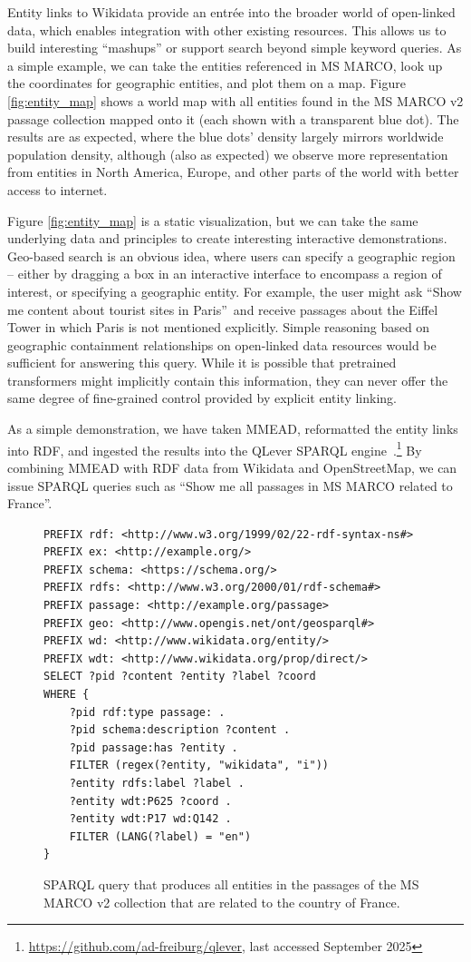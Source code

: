 Entity links to Wikidata provide an entr\'ee into the broader world of open-linked data, which enables integration with other existing resources.
This allows us to build interesting ``mashups'' or support search beyond simple keyword queries.
As a simple example, we can take the entities referenced in MS MARCO, look up the coordinates for geographic entities, and plot them on a map. 
Figure \ref{fig:entity_map} shows a world map with all entities found in the MS MARCO v2 passage collection mapped onto it (each shown with a transparent blue dot).
The results are as expected, where the blue dots' density largely mirrors worldwide population density, although (also as expected) we observe more representation from entities in North America, Europe, and other parts of the world with better access to internet.

Figure \ref{fig:entity_map} is a static visualization, but we can take the same underlying data and principles to create interesting interactive demonstrations.
Geo-based search is an obvious idea, where users can specify a geographic region -- either by dragging a box in an interactive interface to encompass a region of interest, or specifying a geographic entity.
For example, the user might ask ``Show me content about tourist sites in Paris''\ and receive passages about the Eiffel Tower in which Paris is not mentioned explicitly.
Simple reasoning based on geographic containment relationships on open-linked data resources would be sufficient for answering this query.
While it is possible that pretrained transformers might implicitly contain this information, they can never offer the same degree of fine-grained control provided by explicit entity linking.

As a simple demonstration, we have taken MMEAD, reformatted the entity links into RDF, and ingested the results into the QLever SPARQL engine~\citep{qlever}.\footnote{\url{https://github.com/ad-freiburg/qlever}, last accessed September 2025}
By combining MMEAD with RDF data from Wikidata and OpenStreetMap, we can issue SPARQL queries such as ``Show me all passages in MS MARCO related to France''.

\begin{figure}
	\centering
	\begin{verbatim}
PREFIX rdf: <http://www.w3.org/1999/02/22-rdf-syntax-ns#>
PREFIX ex: <http://example.org/> 
PREFIX schema: <https://schema.org/>
PREFIX rdfs: <http://www.w3.org/2000/01/rdf-schema#>
PREFIX passage: <http://example.org/passage> 
PREFIX geo: <http://www.opengis.net/ont/geosparql#>
PREFIX wd: <http://www.wikidata.org/entity/>
PREFIX wdt: <http://www.wikidata.org/prop/direct/>
SELECT ?pid ?content ?entity ?label ?coord 
WHERE {
	?pid rdf:type passage: .
	?pid schema:description ?content .
	?pid passage:has ?entity .
	FILTER (regex(?entity, "wikidata", "i"))
	?entity rdfs:label ?label .
	?entity wdt:P625 ?coord .
	?entity wdt:P17 wd:Q142 .
	FILTER (LANG(?label) = "en")
}
	\end{verbatim}
	\caption{SPARQL query that produces all entities in the passages of the MS MARCO v2 collection that are related to the country of France.}
	\label{fig:code_sparql}
\end{figure}

